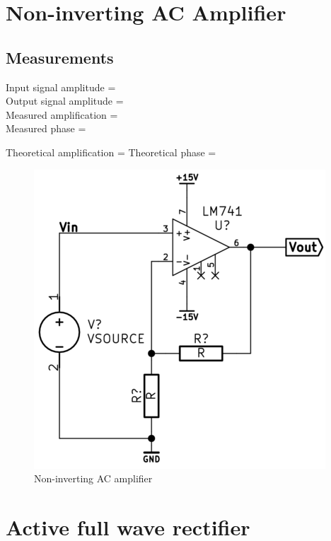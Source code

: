 \documentclass[]{article}
\begin{document}
\section{Non-inverting AC Amplifier}\label{non-inverting-ac-amplifier}

\subsection{Measurements}\label{measurements-3}

Input signal amplitude =\\Output signal amplitude =\\Measured
amplification =\\Measured phase =

Theoretical amplification = Theoretical phase =

\begin{figure}[htbp]
\centering
\includegraphics{img/noninvACamp.png}
\caption{Non-inverting AC amplifier}
\end{figure}


\section{Active full wave rectifier}\label{active-full-wave-rectifier}
\end{document}
